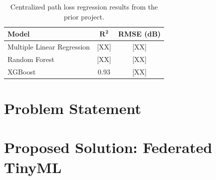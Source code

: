 \documentclass[12pt, a4paper, twoside, openright]{report}
\begin{document}
\begin{table}[H]
  \centering
  \begin{tabular}{lcc}
    \toprule
    \textbf{Model} & $\boldsymbol{R^2}$ & \textbf{RMSE (dB)} \\
    \midrule
    Multiple Linear Regression & [XX]  & [XX] \\
    Random Forest              & [XX]  & [XX] \\
    XGBoost                    & 0.93  & [XX] \\
    \bottomrule
  \end{tabular}
  \caption{Centralized path loss regression results from the prior project.}
  \label{tab:prior-results}
\end{table}


\section{Problem Statement}
\label{sec:problem-statement}

\section{Proposed Solution: Federated TinyML}
\label{sec:proposed-solution}
%
\end{document}
